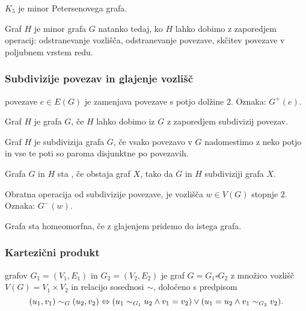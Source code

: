 \begin{primer}
    $K_5$ je minor Petersenovega grafa.
\end{primer}

\begin{opomba}
    Graf $H$ je minor grafa $G$ natanko tedaj, ko $H$ lahko dobimo z zaporedjem operacij: odstranevanje vozlišča, odstranevanje povezave, skčitev povezave v poljubnem vrstem redu.
\end{opomba}

\subsubsection*{Subdivizije povezav in glajenje vozlišč}
\begin{definicija}
     povezave $e \in E(G)$ je zamenjava povezave s potjo dolžine $2$. Oznaka: $G^+(e)$.
\end{definicija}
\begin{definicija}
    Graf $H$ je  grafa $G$, če $H$ lahko dobimo iz $G$ z zaporedjem subdivizij povezav.
\end{definicija}
\begin{opomba}
    Graf $H$ je subdivizija grafa $G$, če vsako povezavo v $G$ nadomestimo z neko potjo in vse te poti so paroma disjunktne po povezavih.
\end{opomba}
\begin{definicija}
    Grafa $G$ in $H$ sta , če obstaja graf $X$, tako da $G$ in $H$ subdiviziji grafa $X$.
\end{definicija}

\begin{definicija}
    Obratna operacija od subdivizije povezave, je  vozlišča $w \in V(G)$ stopnje $2$. Oznaka: $G^-(w)$.
\end{definicija}

\begin{opomba}
    Grafa sta homeomorfna, če z glajenjem pridemo do istega grafa.
\end{opomba}

\subsubsection*{Kartezični produkt}
\begin{definicija}
     grafov $G_1 = (V_1, E_1)$ in $G_2 = (V_2, E_2)$ je graf $G = G_1 \square G_2$ z množico vozlišč $V(G) = V_1 \times V_2$ in relacijo sosednosi $\sim$, določeno s predpisom
    $$(u_1, v_1) \sim_G (u_2, v_2) \Leftrightarrow (u_1 \sim_{G_1} u_2 \land v_1 = v_2) \lor (u_1 = u_2 \land v_1 \sim_{G_2} v_2).$$
\end{definicija}

